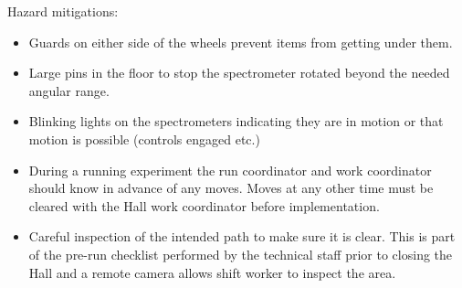 Hazard mitigations:
\begin{itemize}
\item{Guards on either side of the wheels prevent items from getting under them.}
\item{Large pins in the floor to stop the spectrometer rotated beyond the needed angular range.}
\item{Blinking lights on the spectrometers indicating they are in motion or that motion
is possible (controls engaged etc.)}
\item{During a running experiment the run coordinator and work coordinator should know in advance 
of any moves.  Moves at any other time must be cleared with the Hall work coordinator 
before implementation.}
\item{Careful inspection of the intended path to make sure it is clear. This is part of
the pre-run checklist performed by the technical staff prior to closing the Hall and
a remote camera allows shift worker to inspect the area.}
%
\end{itemize}

